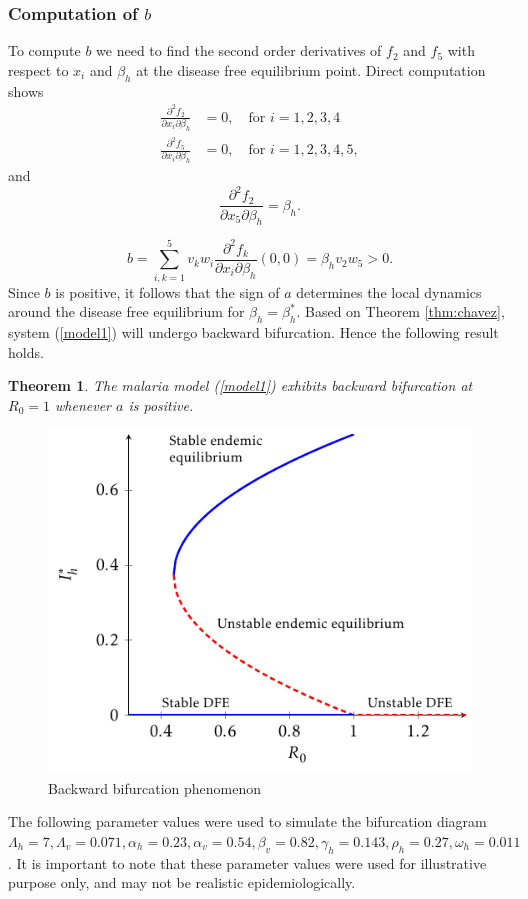 \documentclass[review]{elsarticle}
\newtheorem{theorem}{Theorem}
\begin{document}
\subsubsection*{Computation of $b$}
To compute $b$ we need to find the second order derivatives of $f_2$ and $f_5$ with respect to $x_i$ and $\beta_h$ at the disease free equilibrium point. Direct computation shows
\begin{align*}
\frac{\partial^2 f_2}{\partial x_i\partial \beta_h}&=0,\quad\mbox{for }i=1,2,3,4\\
\frac{\partial^2 f_5}{\partial x_i\partial \beta_h}&=0,\quad\mbox{for }i=1,2,3,4,5,
\end{align*}
and
\[
\frac{\partial^2 f_2}{\partial x_5\partial \beta_h}=\beta_h.
\]

\[
b=\sum_{i,k=1}^{5}v_kw_i\frac{\partial^2f_k}{\partial x_i \partial \beta_h}(0,0)=\beta_h v_2 w_5>0.
\]
Since $b$ is positive, it follows that the sign of $a$ determines the local dynamics around the disease free equilibrium for $\beta_h=\beta_h^*$. Based on Theorem \ref{thm:chavez}, system (\ref{model1}) will undergo backward bifurcation. Hence the following result holds.
\begin{theorem}
The malaria model (\ref{model1}) exhibits backward bifurcation at $R_0=1$ whenever $a$ is positive.
\end{theorem}

\begin{figure}[htb!]
\centering
\includegraphics[width=.6\textwidth]{bifur}
\caption{Backward bifurcation phenomenon}\label{backbifur}
\end{figure}

The following parameter values were used to simulate the bifurcation diagram
$\Lambda_h=7, \Lambda_v= 0.071, \alpha_h=0.23, \alpha_v=0.54, \beta_v=0.82, \gamma_h= 0.143, \rho_h=0.27, \omega_h= 0.011$. It is important to note that these parameter values were used for illustrative purpose only, and may not be realistic epidemiologically.
\end{document}
